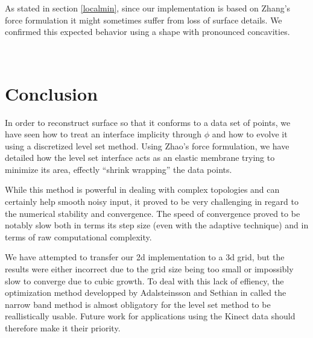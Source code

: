 \documentclass{article}
\begin{document}
As stated in section \ref{localmin}, since our implementation is based on
Zhang's force formulation it might sometimes suffer from loss of surface
details. We confirmed this expected behavior using a shape with pronounced
concavities.

\begin{figure}[H]
  \centering
  ~
\end{figure}


\section{Conclusion}

In order to reconstruct surface so that it conforms to a data set of points, we
have seen how to treat an interface implicity through $\phi$ and how to evolve
it using a discretized level set method. Using Zhao's force formulation, we have
detailed how the level set interface acts as an elastic membrane trying to
minimize its area, effectly ``shrink wrapping'' the data points.


While this method is powerful in dealing with complex topologies and can
certainly help smooth noisy input, it proved to be very challenging in regard to
the numerical stability and convergence. The speed of convergence proved to be
notably slow both in terms its step size (even with the adaptive technique)
and in terms of raw computational complexity.

We have attempted to transfer our 2d implementation to a 3d grid, but the
results were either incorrect due to the grid size being too small or impossibly
slow to converge due to cubic growth. To deal with this lack of effiency, the
optimization method developped by Adalsteinsson and Sethian in
\cite{adalsteinsson1994fast} called the narrow band method is almost obligatory
for the level set method to be reallistically usable. Future work for
applications using the Kinect data should therefore make it their priority.



\end{document}
